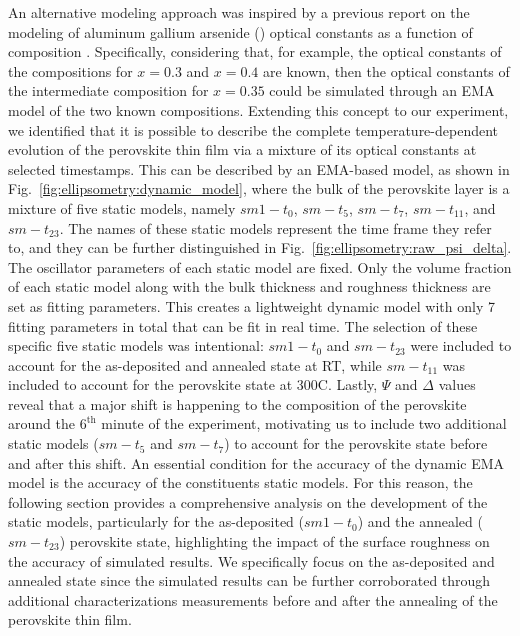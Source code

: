 An alternative modeling approach was inspired by a previous report on the modeling of aluminum gallium arsenide () optical constants as a function of composition \cite{Snyder1990ModelingComposition}. Specifically, considering that, for example, the optical constants of the compositions for $x=0.3$ and $x=0.4$ are known, then the optical constants of the intermediate composition for $x=0.35$ could be simulated through an EMA model of the two known compositions. Extending this concept to our experiment, we identified that it is possible to describe the complete temperature-dependent evolution of the perovskite thin film via a mixture of its optical constants at selected timestamps. This can be described by an EMA-based model, as shown in Fig.~\ref{fig:ellipsometry:dynamic_model}, where the bulk of the perovskite layer is a mixture of five static models, namely $sm1-t_0$, $sm-t_5$, $sm-t_7$, $sm-t_{\text{11}}$, and $sm-t_{\text{23}}$. The names of these static models represent the time frame they refer to, and they can be further distinguished in Fig.~\ref{fig:ellipsometry:raw_psi_delta}. The oscillator parameters of each static model are fixed. Only the volume fraction of each static model along with the bulk thickness and roughness thickness are set as fitting parameters. This creates a lightweight dynamic model with only 7 fitting parameters in total that can be fit in real time. The selection of these specific five static models was intentional: $sm1-t_0$ and $sm-t_{\text{23}}$ were included to account for the as-deposited and annealed state at RT, while $sm-t_{\text{11}}$ was included to account for the perovskite state at 300\degree C. Lastly, $\Psi$ and $\Delta$ values reveal that a major shift is happening to the composition of the perovskite around the $6^{\text{th}}$ minute of the experiment, motivating us to include two additional static models ($sm-t_5$ and $sm-t_7$) to account for the perovskite state before and after this shift. An essential condition for the accuracy of the dynamic EMA model is the accuracy of the constituents static models. For this reason, the following section provides a comprehensive analysis on the development of the static models, particularly for the as-deposited ($sm1-t_0$) and the annealed ($sm-t_{\text{23}}$) perovskite state, highlighting the impact of the surface roughness on the accuracy of simulated results. We specifically focus on the as-deposited and annealed state since the simulated results can be further corroborated through additional characterizations measurements before and after the annealing of the perovskite thin film. 


